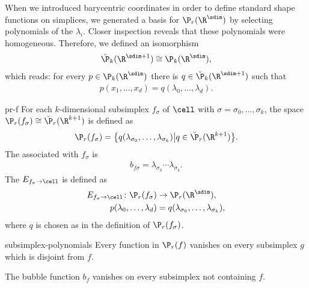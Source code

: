 \begin{remark}
  When we introduced barycentric coordinates in order to define
  standard shape functions on simplices, we generated a basis for
  $\P_r(\R^\sdim)$ by selecting polynomials of the $\lambda_i$. Closer
  inspection reveals that these polynomials were
  homogeneous. Therefore, we defined an isomorphism
  \begin{gather}
    \breve \P_k(\R^{\sdim+1}) \cong \P_k(\R^\sdim),
  \end{gather}
  which reads: for every $p\in \P_k(\R^\sdim)$ there is
  $q\in\breve\P_k(\R^{\sdim+1})$ such that
  \begin{gather}
    p(x_1,\dots,x_d) = q(\lambda_0,\dots,\lambda_d).
  \end{gather}
\end{remark}

\begin{Definition}{pr-f}
  For each $k$-dimensional subsimplex $f_\sigma$ of $\cell$ with
  $\sigma = \sigma_0,\dots,\sigma_k$, the space
  $\P_r(f_\sigma) \cong \breve\P_r(\R^{k+1})$ is defined as
  \begin{gather}
    \P_r(f_\sigma) = \bigl\{
    q(\lambda_{\sigma_0},\dots,\lambda_{\sigma_k})\big\vert
    q\in\breve \P_r(\R^{k+1})\bigr\}.
  \end{gather}
  The  associated with $f_\sigma$ is
  \begin{gather}
    b_{f\sigma} = \lambda_{\sigma_0}\cdots\lambda_{\sigma_k}.
  \end{gather}
  The  $E_{f_\sigma\to\cell}$ is defined as
  \begin{gather}
    \begin{split}
      E_{f_\sigma\to\cell}\colon \P_r(f_\sigma) &\to \P_r(\R^\sdim),\\
      p(\lambda_0,\dots,\lambda_d) &= q(\lambda_{\sigma_0},\dots,\lambda_{\sigma_k}),
    \end{split}
  \end{gather}
  where $q$ is chosen as in the definition of $\P_r(f_\sigma)$.
\end{Definition}

\begin{Lemma}{subsimplex-polynomials}
  Every function in $\P_r(f)$ vanishes on every subsimplex $g$ which
  is disjoint from $f$.

  The bubble function $b_f$ vanishes on every subsimplex not containing $f$.
\end{Lemma}

